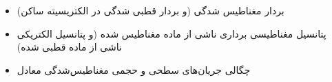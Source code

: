 \ELhold


\begin{ELunit}


\begin{itemize}
\tightlist
\item
  بردار مغناطیس شدگی (و بردار قطبی شدگی در الکتریسیته ساکن)
\end{itemize}


\begin{itemize}
\tightlist
\item
  پتانسیل مغناطیسی برداری ناشی از ماده مغناطیس شده (و پتانسیل الکتریکی ناشی از ماده قطبی شده)
\end{itemize}


\end{ELunit}

\begin{ELjoin}

\begin{itemize}
\tightlist
\item
  چگالی جریان‌های سطحی و حجمی مغناطیس‌شدگی معادل
\end{itemize}

\begin{ELimportant}{}


\end{ELimportant}

\end{ELjoin}

